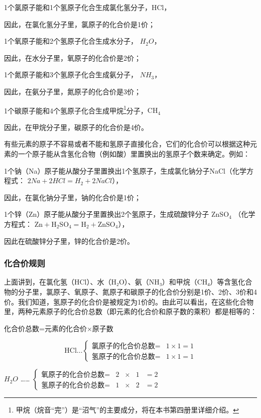 1个氯原子能和1个氢原子化合生成氯化氢分子，HCl，

因此，在氯化氢分子里，氯原子的化合价是1价；

1个氧原子能和2个氢原子化合生成水分子， \(H_{2}O\)，

因此，在水分子里，氧原子的化合价是2价；

1个氮原子能和3个氢原子化合生成氨分子， \(NH_{3}\)，

因此，在氨分子里，氮原子的化合价是3价；

1个碳原子能和4个氢原子化合生成甲烷\footnote{甲烷（烷音``完''）是``沼气''的主要成分，将在本书第四册里详细介绍。}分子，\(\mathrm{CH}_4\)

因此，在甲烷分子里，碳原子的化合价是4价。

有些元素的原子不容易或者不能和氢原子直接化合，它们的化合价可以根据这种元素的一个原子能从含氢化合物（例如酸）里置换出的氢原子个数来确定。例如：

1个钠（Na）原子能从酸分子里置换出1个氢原子，生成氯化钠分子NaCl（化学方程式：
\(2Na+2HCl=H_{2}+2NaCl\)），

因此，在氯化钠分子里，钠的化合价是1价；

1个锌（Zn）原子能从酸分子里置换出2个氢原子，生成硫酸锌分子
\(\mathrm{ZnSO_4}\) （化学方程式：
\(\mathrm{Zn + H_2SO_4 = H_2 + ZnSO_4}\)），

因此在硫酸锌分子里，锌的化合价是2价。

\subsubsection{化合价规则}

上面讲到，在氯化氢（HCl）、水（H₂O）、氨（NH₃）和甲烷（CH₄）等含氢化合物的分子里，氯原子、氧原子、氮原子和碳原子的化合价分别是1价、2价、3价和4价。我们知道，氢原子的化合价是被规定为1价的。由此可以看出，在这些化合物里，两种元素原子的化合价总数（即元素的化合价和原子数的乘积）都是相等的：

化合价总数=元素的化合价×原子数

\[
\mathrm{HCl}\ldots\left\{\begin{array}{ll}\text{氯原子的化合价总数}=&1\times1=1\\\text{氢原子的化合价总数}=&1\times1=1\end{array}\right.
\]

\(H_{2}O\) \ldots\ldots{}
\(\left\{\begin{array}{lllll} \text{氧原子的化合价总数} = & 2 & \times & 1 & = 2 \\ \text{氢原子的化合价总数} = & 1 & \times & 2 & = 2 \end{array}\right.\)

